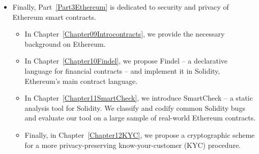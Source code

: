\begin{itemize}
	\item
	Finally, Part~\ref{Part3Ethereum} is dedicated to security and privacy of Ethereum smart contracts.
	\begin{itemize}
		\item 
	In Chapter~\ref{Chapter09Introcontracts}, we provide the necessary background on Ethereum.
		\item
	In Chapter~\ref{Chapter10Findel}, we propose Findel -- a declarative language for financial contracts -- and implement it in Solidity, Ethereum's main contract language.
		\item
	In Chapter~\ref{Chapter11SmartCheck}, we introduce SmartCheck -- a static analysis tool for Solidity.
	We classify and codify common Solidity bugs and evaluate our tool on a large sample of real-world Ethereum contracts.
		\item
	Finally, in Chapter~\ref{Chapter12KYC}, we propose a cryptographic scheme for a more privacy-preserving know-your-customer (KYC) procedure.
	\end{itemize}
\end{itemize}

